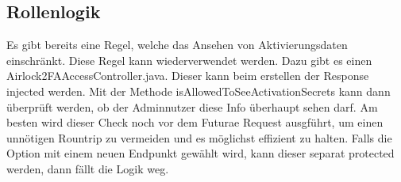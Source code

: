 \subsection{Rollenlogik}
Es gibt bereits eine Regel, welche das Ansehen von Aktivierungsdaten einschränkt. Diese Regel kann wiederverwendet werden. Dazu gibt es einen \flqq Airlock2FAAccessController.java.\frqq{} Dieser kann beim erstellen der Response injected werden. Mit der Methode \flqq isAllowedToSeeActivationSecrets\frqq{} \space kann dann überprüft werden, ob der Adminnutzer diese Info überhaupt sehen darf. Am besten wird dieser Check noch vor dem Futurae Request ausgführt, um einen unnötigen Rountrip zu vermeiden und es möglichst effizient zu halten. Falls die Option mit einem neuen Endpunkt gewählt wird, kann dieser separat protected werden, dann fällt die Logik weg.

